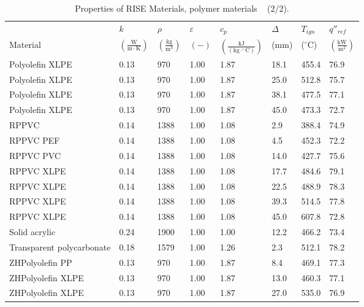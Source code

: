 \begin{table}[!h]
\caption[Properties of RISE Materials, polymer materials]{Properties of RISE Materials, polymer materials ~\cite{RISE:Fire_Database} (2/2).}
\centering
\begin{tabular}{|p{5.5cm}|p{1.0cm}|p{1.0cm}|p{0.8cm}|p{1.4cm}|p{1.0cm}|p{1.0cm}|p{1.2cm}|}
\hline
                                               & $k$    & $\rho$      & $\varepsilon$   & $c_{p}$ & $\Delta$    & $T_{ign}$ & $q''_{ref}$ \\
Material                                       & $\mathrm{\left(\frac{W}{m\cdot K}\right)}$ & $\mathrm{\left(\frac{kg}{m^{3}}\right)}$ & $\mathrm{( - )}$ & $\mathrm{\left(\frac{kJ}{(kg\cdot ^{\circ}C)}\right)}$ &  ($\mathrm{mm}$)   & ($\mathrm{^{\circ}C}$) & $\mathrm{\left(\frac{kW}{m^{2}}\right)}$ \\ \hline
\hline
Polyolefin XLPE & 0.13 & 970 & 1.00 & 1.87 & 18.1 & 455.4 & 76.9 \\ \hline 
Polyolefin XLPE & 0.13 & 970 & 1.00 & 1.87 & 25.0 & 512.8 & 75.7 \\ \hline 
Polyolefin XLPE & 0.13 & 970 & 1.00 & 1.87 & 38.1 & 477.5 & 77.1 \\ \hline 
Polyolefin XLPE & 0.13 & 970 & 1.00 & 1.87 & 45.0 & 473.3 & 72.7 \\ \hline 
RPPVC & 0.14 & 1388 & 1.00 & 1.08 & 2.9 & 388.4 & 74.9 \\ \hline 
RPPVC PEF & 0.14 & 1388 & 1.00 & 1.08 & 4.5 & 452.3 & 72.2 \\ \hline 
RPPVC PVC & 0.14 & 1388 & 1.00 & 1.08 & 14.0 & 427.7 & 75.6 \\ \hline 
RPPVC XLPE & 0.14 & 1388 & 1.00 & 1.08 & 17.7 & 484.6 & 79.1 \\ \hline 
RPPVC XLPE & 0.14 & 1388 & 1.00 & 1.08 & 22.5 & 488.9 & 78.3 \\ \hline 
RPPVC XLPE & 0.14 & 1388 & 1.00 & 1.08 & 39.3 & 514.5 & 77.8 \\ \hline 
RPPVC XLPE & 0.14 & 1388 & 1.00 & 1.08 & 45.0 & 607.8 & 72.8 \\ \hline 
Solid acrylic & 0.24 & 1900 & 1.00 & 1.00 & 12.2 & 466.2 & 73.4 \\ \hline 
Transparent polycarbonate & 0.18 & 1579 & 1.00 & 1.26 & 2.3 & 512.1 & 78.2 \\ \hline 
ZHPolyolefin PP & 0.13 & 970 & 1.00 & 1.87 & 8.4 & 469.1 & 77.3 \\ \hline 
ZHPolyolefin XLPE & 0.13 & 970 & 1.00 & 1.87 & 13.0 & 460.3 & 77.1 \\ \hline 
ZHPolyolefin XLPE & 0.13 & 970 & 1.00 & 1.87 & 27.0 & 535.0 & 76.9 \\ \hline 
\end{tabular}
\label{Properties_RISE_Materials_polymers2}
\end{table}

